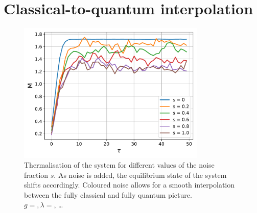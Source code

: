 \section{Classical-to-quantum interpolation}

\label{sec:classical_to_quantum}

\begin{figure}[h]
    \centering
    \includegraphics[width=0.8\textwidth]{figures/slide_broken/thermalisation.pdf}
    \caption[Thermalisation of the system for different values of the noise fraction $s$.]{Thermalisation of the system for different values of the noise fraction $s$. As noise is added, the equilibrium state of the system shifts accordingly. Coloured noise allows for a smooth interpolation between the fully classical and fully quantum picture.\\ $g=, \lambda=$, \dots}
    \label{fig:thermalisation_different_noise_fracs}
\end{figure}

